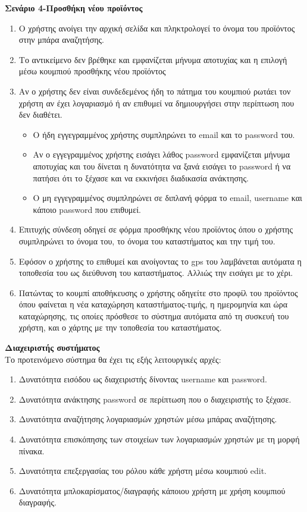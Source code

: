 \documentclass[12pt, oneside, a4paper]{report}
\begin{document}
\vspace{0.5cm}
\textbf{Σενάριο 4-Προσθήκη νέου προϊόντος}\\
\begin{enumerate}
 \item Ο χρήστης ανοίγει την αρχική σελίδα και πληκτρολογεί το όνομα του προϊόντος στην μπάρα αναζητήσης.
 \item Το αντικείμενο δεν βρέθηκε και εμφανίζεται μήνυμα αποτυχίας και η επιλογή μέσω κουμπιού προσθήκης νέου προϊόντος
 \item Αν ο χρήστης δεν είναι συνδεδεμένος ήδη το πάτημα του κουμπιού ρωτάει τον χρήστη αν έχει λογαριασμό ή αν επιθυμεί να δημιουργήσει στην περίπτωση που δεν διαθέτει.
 \begin{itemize}
  \item Ο ήδη εγγεγραμμένος χρήστης συμπληρώνει το email και το password του.
  \item Αν ο εγγεγραμμένος χρήστης εισάγει λάθος password εμφανίζεται μήνυμα αποτυχίας και του δίνεται η  δυνατότητα να ξανά εισάγει το password ή να πατήσει ότι το ξέχασε και να εκκινήσει διαδικασία ανάκτησης.
  \item O μη εγγεγραμμένος συμπληρώνει σε διπλανή φόρμα το email, username και κάποιο password που επιθυμεί.
 \end{itemize}
 \item Επιτυχής σύνδεση οδηγεί σε φόρμα προσθήκης νέου προϊόντος όπου ο χρήστης συμπληρώνει το όνομα του, το όνομα του καταστήματος και την τιμή του.
 \item Εφόσον ο χρήστης το επιθυμεί και ανοίγοντας το gps του λαμβάνεται αυτόματα η τοποθεσία του ως διεύθυνση του καταστήματος. Αλλιώς την εισάγει με το χέρι.
 \item Πατώντας το κουμπί αποθήκευσης ο χρήστης οδηγείτε στο προφίλ του προϊόντος όπου φαίνεται η νέα καταχώρηση καταστήματος-τιμής, η ημερομηνία και ώρα καταχώρησης, τις οποίες πρόσθεσε το σύστημα αυτόματα από τη συσκευή του χρήστη, και ο χάρτης με την τοποθεσία του καταστήματος.
\end{enumerate}

\vspace{0.5cm}
\textbf{Διαχειριστής συστήματος}\\
\vspace{0.5cm}
Το προτεινόμενο σύστημα θα έχει τις εξής λειτουργικές αρχές:
\begin{enumerate}
 \item Δυνατότητα εισόδου ως διαχειριστής δίνοντας username και password.
 \item Δυνατότητα ανάκτησης password σε περίπτωση που ο διαχειριστής το ξέχασε.
 \item Δυνατότητα αναζήτησης λογαριασμών χρηστών μέσω μπάρας αναζήτησης.
 \item Δυνατότητα επισκόπησης των στοιχείων των λογαριασμών χρηστών με τη μορφή πίνακα.
 \item Δυνατότητα επεξεργασίας του ρόλου κάθε χρήστη μέσω κουμπιού edit.
 \item Δυνατότητα μπλοκαρίσματος/διαγραφής κάποιου χρήστη με χρήση κουμπιού διαγραφής.
\end{enumerate}
\end{document}
